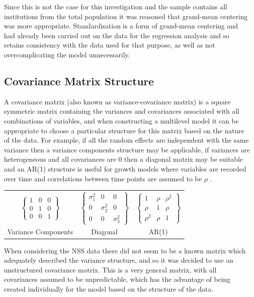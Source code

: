 \documentclass[11pt,a4paper]{report}
\begin{document}
Since this is not the case for this investigation and the sample contains all institutions from the total population it was reasoned that grand-mean centering was more appropriate. Standardisation is a form of grand-mean centering and had already been carried out on the data for the regression analysis and so retains consistency with the data used for that purpose, as well as not overcomplicating the model unnecessarily. 

\subsection{Covariance Matrix Structure}
A covariance matrix (also known as variance-covariance matrix) is a square symmetric matrix containing the variances and covariances associated with all combinations of variables, and when constructing a multilevel model it can be appropriate to choose a particular structure for this matrix based on the nature of the data. For example, if all the random effects are independent with the same variance then a variance components structure may be applicable, if variances are heterogeneous and all covariances are 0 then a diagonal matrix may be suitable and an AR(1) structure is useful for growth models where variables are recorded over time and correlations between time points are assumed to be $\rho$ \cite{field2009discovering}. 

\begin{center}
\begin{tabular}{c c c}
	$ \begin{Bmatrix}  1 & 0  & 0\\ 0 & 1&0 \\ 0 & 0 & 1 \end{Bmatrix}$ &
	$ \begin{Bmatrix} \sigma_{1}^{2} & 0 & 0 \\ 0 & \sigma_{2}^{2} & 0 \\ 0 & 0 & \sigma_{3}^{2} \end{Bmatrix}$	&
	$ \begin{Bmatrix} 1 & \rho & \rho^2 \\ \rho & 1 & \rho \\ \rho^2 & \rho & 1 \end{Bmatrix} $ \\
	Variance Components & Diagonal & AR(1) \\
\end{tabular}
\end{center}


When considering the NSS data there did not seem to be a known matrix which adequately described the variance structure, and so it was decided to use an unstructured covariance matrix. This is a very general matrix, with all covariances assumed to be unpredictable, which has the advantage of being created individually for the model based on the structure of the data. 
\end{document}
